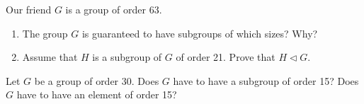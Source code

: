 \documentclass[12pt,letterpaper,boxed]{hmcpset}
\begin{document}
\begin{solution}
\end{solution}

\clearpage

\begin{problem}[12.3.7]
Our friend $G$ is a group of order 63.
\begin{enumerate}[label=\alph*]
\item The group $G$ is guaranteed to have subgroups of which sizes? Why?
\item Assume that $H$ is a subgroup of $G$ of order 21. Prove that $H \triangleleft G$.
\end{enumerate}
\end{problem}

\begin{solution}
\end{solution}

\clearpage

\begin{problem}[12.3.12]
Let $G$ be a group of order 30. Does $G$ have to have a subgroup of order 15? Does $G$ have to have an element of order 15?
\end{problem}

\begin{solution}

\end{solution}
\end{document}
